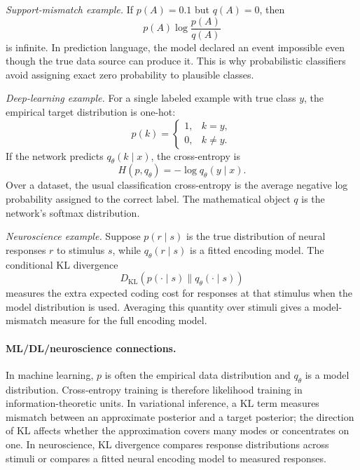 \emph{Support-mismatch example.}
If \(p(A)=0.1\) but \(q(A)=0\), then
\[
p(A)\log\frac{p(A)}{q(A)}
\]
is infinite. In prediction language, the model declared an event impossible even though the true data source can produce it. This is why probabilistic classifiers avoid assigning exact zero probability to plausible classes.

\emph{Deep-learning example.}
For a single labeled example with true class \(y\), the empirical target distribution is one-hot:
\[
p(k)=
\begin{cases}
1, & k=y,\\
0, & k\neq y.
\end{cases}
\]
If the network predicts \(q_\theta(k\mid x)\), the cross-entropy is
\[
H(p,q_\theta)=-\log q_\theta(y\mid x).
\]
Over a dataset, the usual classification cross-entropy is the average negative log probability assigned to the correct label. The mathematical object \(q\) is the network's softmax distribution.

\emph{Neuroscience example.}
Suppose \(p(r\mid s)\) is the true distribution of neural responses \(r\) to stimulus \(s\), while \(q_\theta(r\mid s)\) is a fitted encoding model. The conditional KL divergence
\[
D_{\mathrm{KL}}(p(\cdot\mid s)\|q_\theta(\cdot\mid s))
\]
measures the extra expected coding cost for responses at that stimulus when the model distribution is used. Averaging this quantity over stimuli gives a model-mismatch measure for the full encoding model.

\paragraph{ML/DL/neuroscience connections.}
In machine learning, \(p\) is often the empirical data distribution and \(q_\theta\) is a model distribution. Cross-entropy training is therefore likelihood training in information-theoretic units. In variational inference, a KL term measures mismatch between an approximate posterior and a target posterior; the direction of KL affects whether the approximation covers many modes or concentrates on one. In neuroscience, KL divergence compares response distributions across stimuli or compares a fitted neural encoding model to measured responses.

